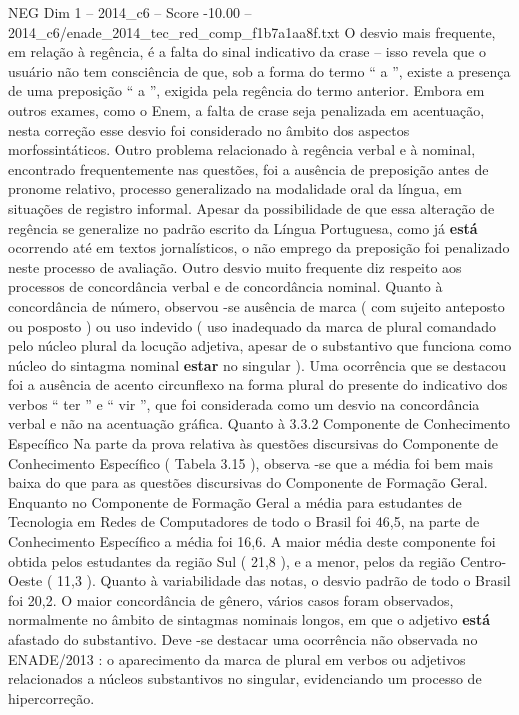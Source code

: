 \begin{textsample}{NEG Dim 1 – 2014\_c6 – Score -10.00 – 2014\_c6/enade\_2014\_tec\_red\_comp\_f1b7a1aa8f.txt}
O desvio mais frequente, em relação à regência, é a falta do sinal indicativo da crase – isso revela que o usuário não tem consciência de que, sob a forma do termo “ a ”, existe a presença de uma preposição “ a ”, exigida pela regência do termo anterior.
Embora em outros exames, como o Enem, a falta de crase seja penalizada em acentuação, nesta correção esse desvio foi considerado no âmbito dos aspectos morfossintáticos.
Outro problema relacionado à regência verbal e à nominal, encontrado frequentemente nas questões, foi a ausência de preposição antes de pronome relativo, processo generalizado na modalidade oral da língua, em situações de registro informal.
Apesar da possibilidade de que essa alteração de regência se generalize no padrão escrito da Língua Portuguesa, como já \textbf{está} ocorrendo até em textos jornalísticos, o não emprego da preposição foi penalizado neste processo de avaliação.
Outro desvio muito frequente diz respeito aos processos de concordância verbal e de concordância nominal.
Quanto à concordância de número, observou -se ausência de marca ( com sujeito anteposto ou posposto ) ou uso indevido ( uso inadequado da marca de plural comandado pelo núcleo plural da locução adjetiva, apesar de o substantivo que funciona como núcleo do sintagma nominal \textbf{estar} no singular ).
Uma ocorrência que se destacou foi a ausência de acento circunflexo na forma plural do presente do indicativo dos verbos “ ter ” e “ vir ”, que foi considerada como um desvio na concordância verbal e não na acentuação gráfica.
Quanto à 3.3.2 Componente de Conhecimento Específico Na parte da prova relativa às questões discursivas do Componente de Conhecimento Específico ( Tabela 3.15 ), observa -se que a média foi bem mais baixa do que para as questões discursivas do Componente de Formação Geral.
Enquanto no Componente de Formação Geral a média para estudantes de Tecnologia em Redes de Computadores de todo o Brasil foi 46,5, na parte de Conhecimento Específico a média foi 16,6.
A maior média deste componente foi obtida pelos estudantes da região Sul ( 21,8 ), e a menor, pelos da região Centro-Oeste ( 11,3 ).
Quanto à variabilidade das notas, o desvio padrão de todo o Brasil foi 20,2.
O maior concordância de gênero, vários casos foram observados, normalmente no âmbito de sintagmas nominais longos, em que o adjetivo \textbf{está} afastado do substantivo.
Deve -se destacar uma ocorrência não observada no ENADE/2013 : o aparecimento da marca de plural em verbos ou adjetivos relacionados a núcleos substantivos no singular, evidenciando um processo de hipercorreção.

\end{textsample}
